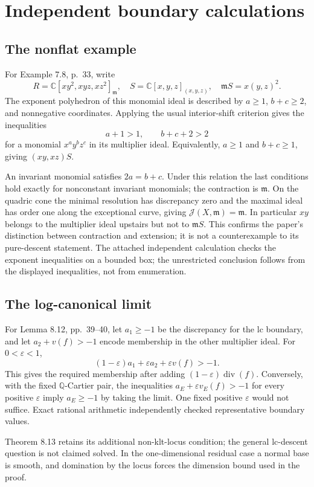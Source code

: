 \documentclass[10pt]{article}
\begin{document}
\section*{Independent boundary calculations}
\subsection*{The nonflat example}
For Example 7.8, p. 33, write \[R=\mathbb C[xy^2,xyz,xz^2]_{\mathfrak m},
 \quad S=\mathbb C[x,y,z]_{(x,y,z)},\quad
 \mathfrak mS=x(y,z)^2.\] The exponent polyhedron of this monomial ideal is described by \(a\geq1\), \(b+c\geq2\), and nonnegative coordinates. Applying the usual interior-shift criterion gives the inequalities \[a+1>1,\qquad b+c+2>2\] for a monomial \(x^ay^bz^c\) in its multiplier ideal. Equivalently, \(a\geq1\) and \(b+c\geq1\), giving \((xy,xz)S\).\par
An invariant monomial satisfies \(2a=b+c\). Under this relation the last conditions hold exactly for nonconstant invariant monomials; the contraction is \(\mathfrak m\). On the quadric cone the minimal resolution has discrepancy zero and the maximal ideal has order one along the exceptional curve, giving \(\mathcal J(X,\mathfrak m)=\mathfrak m\). In particular \(xy\) belongs to the multiplier ideal upstairs but not to \(\mathfrak mS\). This confirms the paper’s distinction between contraction and extension; it is not a counterexample to its pure-descent statement. The attached independent calculation checks the exponent inequalities on a bounded box; the unrestricted conclusion follows from the displayed inequalities, not from enumeration.\par
\subsection*{The log-canonical limit}
For Lemma 8.12, pp. 39–40, let \(a_1\geq-1\) be the discrepancy for the lc boundary, and let \(a_2+v(f)>-1\) encode membership in the other multiplier ideal. For \(0<\varepsilon<1\), \[(1-\varepsilon)a_1+\varepsilon a_2+\varepsilon v(f)>-1.\] This gives the required membership after adding \((1-\varepsilon)\operatorname{div}(f)\). Conversely, with the fixed \(\mathbb Q\)-Cartier pair, the inequalities \(a_E+\varepsilon v_E(f)>-1\) for every positive \(\varepsilon\) imply \(a_E\geq-1\) by taking the limit. One fixed positive \(\varepsilon\) would not suffice. Exact rational arithmetic independently checked representative boundary values.\par
Theorem 8.13 retains its additional non-klt-locus condition; the general lc-descent question is not claimed solved. In the one-dimensional residual case a normal base is smooth, and domination by the locus forces the dimension bound used in the proof.\par
\end{document}
